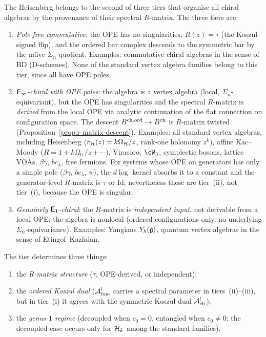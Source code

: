 The Heisenberg belongs to the second of three tiers that
organise all chiral algebras by the provenance of their spectral
$R$-matrix. The three tiers are:
\begin{enumerate}[label=\textup{(\roman*)}]
\item \emph{Pole-free commutative}:
 the OPE has no singularities, $R(z) = \tau$
 (the Koszul-signed flip), and the ordered bar complex
 descends to the symmetric bar by the na\"{\i}ve
 $\Sigma_n$-quotient.
 Examples: commutative chiral algebras in the sense of BD
 (D-schemes). None of the standard vertex algebra families
 belong to this tier, since all have OPE poles.

\item \emph{$\mathsf{E}_{\infty}$-chiral with OPE poles}:
 the algebra is a vertex algebra (local, $\Sigma_n$-equivariant),
 but the OPE has singularities and the spectral $R$-matrix is
 \emph{derived} from the local OPE via analytic continuation
 of the flat connection on configuration space.
 The descent $\bar{B}^{\mathrm{ch,ord}} \to \bar{B}^{\mathrm{ch}}$ is
 $R$-matrix twisted (Proposition~\ref{prop:r-matrix-descent}).
 Examples: all standard vertex algebras,
 including Heisenberg ($r_{\mathcal{H}}(z)=k\Omega_{\mathcal{H}}/z$, rank-one holonomy
 $z^k$), affine Kac--Moody
 ($R = 1 + k\Omega_{\mathrm{tr}}/z + \cdots$), Virasoro, $\cW_3$, symplectic
 bosons, lattice VOAs, $\beta\gamma$, $bc_\lambda$,
 free fermions. For systems whose OPE on generators
 has only a simple pole ($\beta\gamma$, $bc_\lambda$, $\psi$),
 the $d\log$ kernel absorbs it to a constant and the
 generator-level $R$-matrix is $\tau$ or $\mathrm{Id}$;
 nevertheless these are tier~(ii), not tier~(i),
 because the OPE is singular.

\item \emph{Genuinely $\mathsf{E}_1$-chiral}:
 the $R$-matrix is \emph{independent input}, not derivable
 from a local OPE; the algebra is nonlocal (ordered configurations
 only, no underlying $\Sigma_n$-equivariance).
 Examples: Yangians $Y_\hbar(\mathfrak{g})$, quantum vertex algebras
 in the sense of Etingof--Kazhdan.
\end{enumerate}

\noindent
The tier determines three things:
\begin{enumerate}[label=(\alph*),nosep]
\item the \emph{$R$-matrix structure} ($\tau$, OPE-derived, or
 independent);
\item the \emph{ordered Koszul dual}
 ($\mathcal{A}^!_{\mathrm{line}}$ carries a spectral parameter
 in tiers~(ii)--(iii), but in tier~(i) it agrees with
 the symmetric Koszul dual $\mathcal{A}^!_{\mathrm{ch}}$);
\item the \emph{genus-$1$ regime} (decoupled when
 $c_0 = 0$, entangled when $c_0 \ne 0$; the decoupled
 case occurs only for $\mathcal{H}_k$ among the standard
 families).
\end{enumerate}

